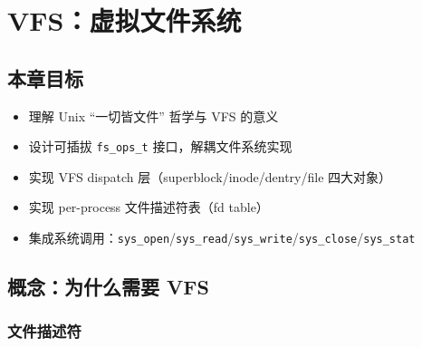 \chapter{VFS：虚拟文件系统}
\label{ch:vfs}

\section{本章目标}

\begin{itemize}
  \item 理解 Unix ``一切皆文件'' 哲学与 VFS 的意义
  \item 设计可插拔 \texttt{fs\_ops\_t} 接口，解耦文件系统实现
  \item 实现 VFS dispatch 层（superblock/inode/dentry/file 四大对象）
  \item 实现 per-process 文件描述符表（fd table）
  \item 集成系统调用：\texttt{sys\_open}/\texttt{sys\_read}/\texttt{sys\_write}/\texttt{sys\_close}/\texttt{sys\_stat}
\end{itemize}

\section{概念：为什么需要 VFS}
\label{sec:vfs-concept}


\subsection{文件描述符}

